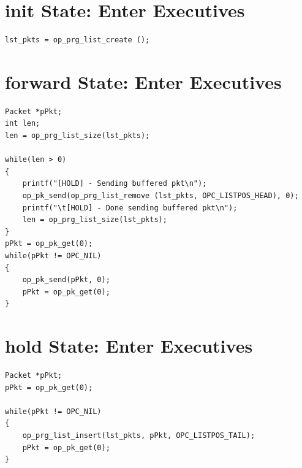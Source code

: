 \section{init State: Enter Executives}
{\tiny
\begin{verbatim}
lst_pkts = op_prg_list_create (); 
\end{verbatim}
}

\section{forward State: Enter Executives}
{\tiny
\begin{verbatim}
Packet *pPkt;
int len;
len = op_prg_list_size(lst_pkts);

while(len > 0)
{
	printf("[HOLD] - Sending buffered pkt\n");
	op_pk_send(op_prg_list_remove (lst_pkts, OPC_LISTPOS_HEAD), 0);
	printf("\t[HOLD] - Done sending buffered pkt\n");
	len = op_prg_list_size(lst_pkts);	
}
pPkt = op_pk_get(0);
while(pPkt != OPC_NIL)
{
	op_pk_send(pPkt, 0);
	pPkt = op_pk_get(0);
}

\end{verbatim}
}

\section{hold State: Enter Executives}
{\tiny
\begin{verbatim}
Packet *pPkt;
pPkt = op_pk_get(0);

while(pPkt != OPC_NIL)
{
	op_prg_list_insert(lst_pkts, pPkt, OPC_LISTPOS_TAIL);
	pPkt = op_pk_get(0);
}

\end{verbatim}
}